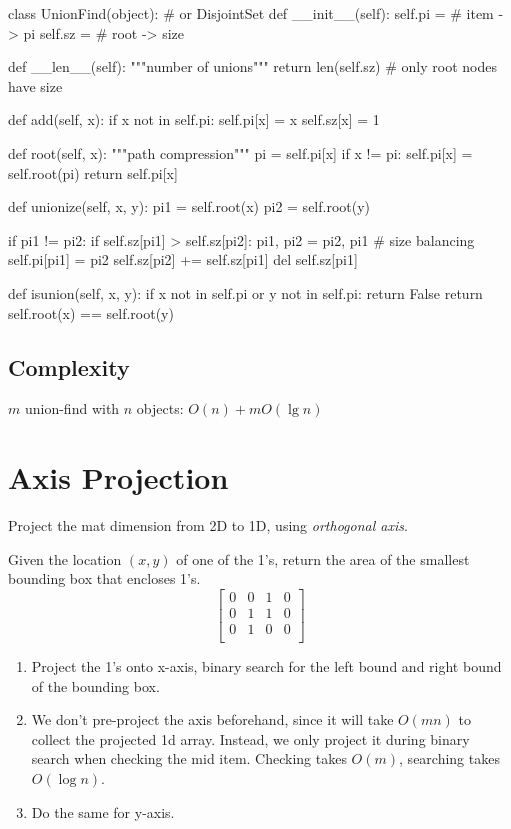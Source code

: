 \begin{python}
class UnionFind(object):  # or DisjointSet
  def __init__(self):
    self.pi = {}  # item -> pi
    self.sz = {}  # root -> size

  def __len__(self):
    """number of unions"""
    return len(self.sz)  # only root nodes have size

  def add(self, x):
    if x not in self.pi:
      self.pi[x] = x
      self.sz[x] = 1

  def root(self, x):
    """path compression"""
    pi = self.pi[x]
    if x != pi:
      self.pi[x] = self.root(pi)
    return self.pi[x]

  def unionize(self, x, y):
    pi1 = self.root(x)
    pi2 = self.root(y)

    if pi1 != pi2:
      if self.sz[pi1] > self.sz[pi2]:
        pi1, pi2 = pi2, pi1
        # size balancing
      self.pi[pi1] = pi2
      self.sz[pi2] += self.sz[pi1]
      del self.sz[pi1]

  def isunion(self, x, y):
    if x not in self.pi or y not in self.pi:
      return False
    return self.root(x) == self.root(y)
\end{python}

\subsection{Complexity}
$m$ union-find with $n$ objects: $O(n)+m O(\lg n)$

\section{Axis Projection}
Project the mat dimension from 2D to 1D, using \textit{orthogonal axis}.

 Given the location $(x, y)$ of one of the 1's, return the area of the smallest bounding box that encloses 1's.
$$
\begin{bmatrix}
0& 0& 1& 0 \\
0& 1& 1& 0 \\
0& 1& 0& 0 \\
\end{bmatrix}
$$

\begin{enumerate}
\item Project the 1's onto x-axis, binary search for the left bound and right bound of the bounding box. 
\item We don't pre-project the axis beforehand, since it will take $O(mn)$ to collect the projected 1d array. Instead, we only project it during binary search when checking the mid item. Checking takes $O(m)$, searching takes $O(\log n)$. 
\item Do the same for y-axis.
\end{enumerate}

